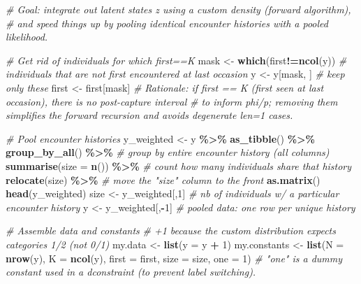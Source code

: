 \documentclass[
  12pt,
]{krantz}
\newenvironment{Shaded}{\begin{snugshade}}{\end{snugshade}}
\newcommand{\AttributeTok}[1]{\textcolor[rgb]{0.13,0.29,0.53}{#1}}
\newcommand{\CommentTok}[1]{\textcolor[rgb]{0.56,0.35,0.01}{\textit{#1}}}
\newcommand{\DecValTok}[1]{\textcolor[rgb]{0.00,0.00,0.81}{#1}}
\newcommand{\FunctionTok}[1]{\textcolor[rgb]{0.13,0.29,0.53}{\textbf{#1}}}
\newcommand{\NormalTok}[1]{#1}
\newcommand{\OtherTok}[1]{\textcolor[rgb]{0.56,0.35,0.01}{#1}}
\newcommand{\SpecialCharTok}[1]{\textcolor[rgb]{0.81,0.36,0.00}{\textbf{#1}}}
\begin{document}
\begin{Shaded}
\begin{Highlighting}[]
\CommentTok{\# Goal: integrate out latent states z using a custom density (forward algorithm),}
\CommentTok{\# and speed things up by pooling identical encounter histories with a pooled likelihood.}

\CommentTok{\# Get rid of individuals for which first==K}
\NormalTok{mask }\OtherTok{\textless{}{-}} \FunctionTok{which}\NormalTok{(first}\SpecialCharTok{!=}\FunctionTok{ncol}\NormalTok{(y)) }\CommentTok{\# individuals that are not first encountered at last occasion}
\NormalTok{y }\OtherTok{\textless{}{-}}\NormalTok{ y[mask, ]                }\CommentTok{\# keep only these}
\NormalTok{first }\OtherTok{\textless{}{-}}\NormalTok{ first[mask]}
\CommentTok{\# Rationale: if first == K (first seen at last occasion), there is no post{-}capture interval}
\CommentTok{\# to inform phi/p; removing them simplifies the forward recursion and avoids degenerate len=1 cases.}

\CommentTok{\# Pool encounter histories}
\NormalTok{y\_weighted }\OtherTok{\textless{}{-}}\NormalTok{ y }\SpecialCharTok{\%\textgreater{}\%} 
  \FunctionTok{as\_tibble}\NormalTok{() }\SpecialCharTok{\%\textgreater{}\%} 
  \FunctionTok{group\_by\_all}\NormalTok{() }\SpecialCharTok{\%\textgreater{}\%}                 \CommentTok{\# group by entire encounter history (all columns)}
  \FunctionTok{summarise}\NormalTok{(}\AttributeTok{size =} \FunctionTok{n}\NormalTok{()) }\SpecialCharTok{\%\textgreater{}\%}          \CommentTok{\# count how many individuals share that history}
  \FunctionTok{relocate}\NormalTok{(size) }\SpecialCharTok{\%\textgreater{}\%}                 \CommentTok{\# move the "size" column to the front}
  \FunctionTok{as.matrix}\NormalTok{()}
\FunctionTok{head}\NormalTok{(y\_weighted)}
\NormalTok{size }\OtherTok{\textless{}{-}}\NormalTok{ y\_weighted[,}\DecValTok{1}\NormalTok{] }\CommentTok{\# nb of individuals w/ a particular encounter history}
\NormalTok{y }\OtherTok{\textless{}{-}}\NormalTok{ y\_weighted[,}\SpecialCharTok{{-}}\DecValTok{1}\NormalTok{]   }\CommentTok{\# pooled data: one row per unique history}

\CommentTok{\# Assemble data and constants}
\CommentTok{\# +1 because the custom distribution expects categories 1/2 (not 0/1)}
\NormalTok{my.data }\OtherTok{\textless{}{-}} \FunctionTok{list}\NormalTok{(}\AttributeTok{y =}\NormalTok{ y }\SpecialCharTok{+} \DecValTok{1}\NormalTok{)}
\NormalTok{my.constants }\OtherTok{\textless{}{-}} \FunctionTok{list}\NormalTok{(}\AttributeTok{N =} \FunctionTok{nrow}\NormalTok{(y), }
                     \AttributeTok{K =} \FunctionTok{ncol}\NormalTok{(y), }
                     \AttributeTok{first =}\NormalTok{ first,}
                     \AttributeTok{size =}\NormalTok{ size,}
                     \AttributeTok{one =} \DecValTok{1}\NormalTok{)}
\CommentTok{\# "one" is a dummy constant used in a dconstraint (to prevent label switching).}


\end{Highlighting}
\end{Shaded}
\end{document}
